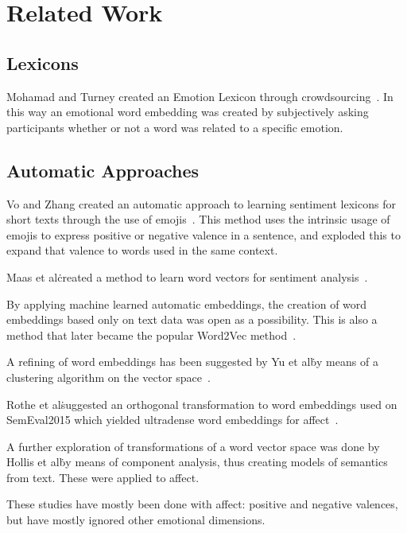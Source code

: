 \chapter{Related Work}\label{chap:Related Work}

\section{Lexicons}\label{sec:Lexicons}

Mohamad and Turney created an Emotion Lexicon through crowdsourcing~\cite{mohammad_crowdsourcing_2013}. In this way an emotional word embedding was created by subjectively asking participants whether or not a word was related to a specific emotion.

\section{Automatic Approaches}\label{sec:Automatic Approaches}
Vo and Zhang created an automatic approach to learning sentiment lexicons for short texts through the use of emojis~\cite{vo_dont_2016}. This method uses the intrinsic usage of emojis to express positive or negative valence in a sentence, and exploded this to expand that valence to words used in the same context.

Maas et al\. created a method to learn word vectors for sentiment analysis~\cite{maas_learning_2011}.

By applying machine learned automatic embeddings, the creation of word embeddings based only on text data was open as a possibility. This is also a method that later became the popular Word2Vec method~\cite{mikolov_distributed_2013}.

A refining of word embeddings has been suggested by Yu et al\. by means of a clustering algorithm on the vector space~\cite{yu_refining_2017}.

Rothe et al\. suggested an orthogonal transformation to word embeddings used on SemEval2015 which yielded ultradense word embeddings for affect~\cite{rothe_ultradense_2016}.

A further exploration of transformations of a word vector space was done by Hollis et al\. by means of component analysis, thus creating models of semantics from text. These were applied to affect\cite{hollis_principals_2016}.

These studies have mostly been done with affect: positive and negative valences, but have mostly ignored other emotional dimensions.

